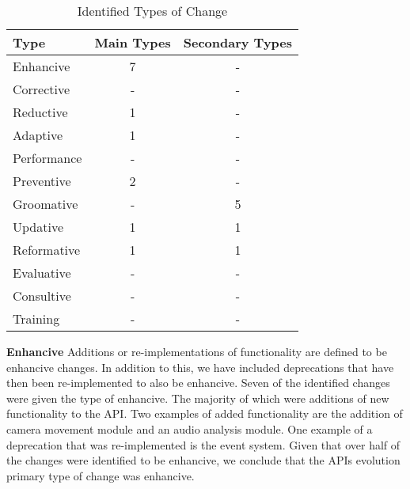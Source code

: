 \documentclass{sig-alternate}
\begin{document}
\begin{table}
       \centering
       \begin{tabular}[ht]{l|c|c}
              \toprule

              \textbf{Type}        & \textbf{Main Types}       &\textbf{Secondary Types}   \\ \midrule
              Enhancive            & 7                         & -                         \\ \hline
              Corrective           & -                         & -                         \\ \hline
              Reductive            & 1                         & -                         \\ \hline
              Adaptive             & 1                         & -                         \\ \hline
              Performance          & -                         & -                         \\ \hline
              Preventive           & 2                         & -                         \\ \hline
              Groomative           & -                         & 5                         \\ \hline
              Updative             & 1                         & 1                         \\ \hline
              Reformative          & 1                         & 1                         \\ \hline
              Evaluative           & -                         & -                         \\ \hline
              Consultive           & -                         & -                         \\ \hline
              Training             & -                         & -                         \\ 

              \bottomrule

       \end{tabular}
       \caption{Identified Types of Change}
       \label{table:type_counts}
\end{table}

\smallskip \noindent
\textbf{Enhancive  }
Additions or re-implementations of functionality are defined to be enhancive changes. In addition to this, we have included deprecations that have then been re-implemented to also be enhancive.
Seven of the identified changes were given the type of enhancive. The majority of which were additions of new functionality to the API. Two examples of added functionality are the addition of camera movement module and an audio analysis module. One example of a deprecation that was re-implemented is the event system.
Given that over half of the changes were identified to be enhancive, we conclude that the APIs evolution primary type of change was enhancive. 
\end{document}
